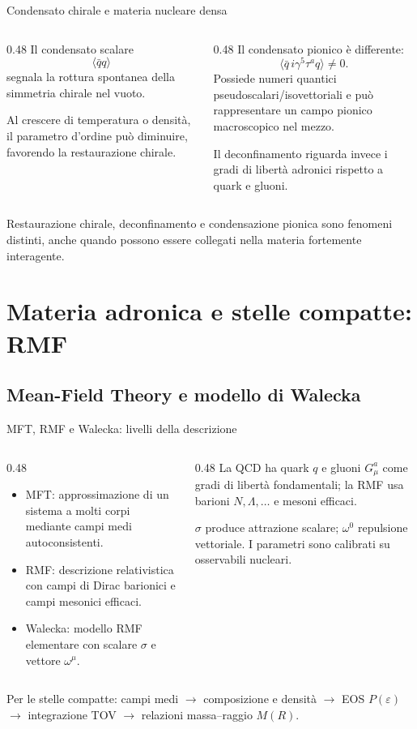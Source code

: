 \begin{frame}{Condensato chirale e materia nucleare densa}
\small
\begin{columns}[T,onlytextwidth]
\begin{column}{0.48\textwidth}
Il condensato scalare
\[
 \langle\bar q q\rangle
\]
segnala la rottura spontanea della simmetria chirale nel vuoto.

Al crescere di temperatura o densità, il parametro d'ordine può diminuire, favorendo la restaurazione chirale.
\end{column}
\begin{column}{0.48\textwidth}
Il condensato pionico è differente:
\[
 \langle\bar q\,i\gamma^5\tau^a q\rangle\neq0.
\]
Possiede numeri quantici pseudoscalari/isovettoriali e può rappresentare un campo pionico macroscopico nel mezzo.

Il deconfinamento riguarda invece i gradi di libertà adronici rispetto a quark e gluoni.
\end{column}
\end{columns}
\medskip
Restaurazione chirale, deconfinamento e condensazione pionica sono fenomeni distinti, anche quando possono essere collegati nella materia fortemente interagente.
\end{frame}

\section{Materia adronica e stelle compatte: RMF}

\subsection{Mean-Field Theory e modello di Walecka}

\begin{frame}{MFT, RMF e Walecka: livelli della descrizione}
\small
\begin{columns}[T,onlytextwidth]
\begin{column}{0.48\textwidth}
\begin{itemize}
\item MFT: approssimazione di un sistema a molti corpi mediante campi medi autoconsistenti.
\item RMF: descrizione relativistica con campi di Dirac barionici e campi mesonici efficaci.
\item Walecka: modello RMF elementare con scalare $\sigma$ e vettore $\omega^\mu$.
\end{itemize}
\end{column}
\begin{column}{0.48\textwidth}
La QCD ha quark $q$ e gluoni $G_\mu^a$ come gradi di libertà fondamentali; la RMF usa barioni $N,\Lambda,\ldots$ e mesoni efficaci.

$\sigma$ produce attrazione scalare; $\omega^0$ repulsione vettoriale. I parametri sono calibrati su osservabili nucleari.
\end{column}
\end{columns}
\medskip
Per le stelle compatte: campi medi $\to$ composizione e densità $\to$ EOS $P(\varepsilon)$ $\to$ integrazione TOV $\to$ relazioni massa--raggio $M(R)$.
\end{frame}

